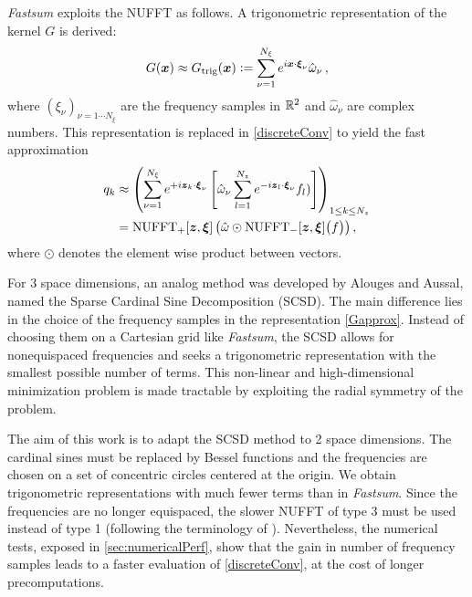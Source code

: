 \documentclass[smallextended]{svjour3}
\begin{document}
\textit{Fastsum} exploits the NUFFT as follows. A trigonometric representation of the kernel $G$ is derived:
\begin{equation}
\label{Gapprox}
G(\boldsymbol{x}) \approx G_{\text{trig}}(\boldsymbol{x}) \mathrel{\mathop:}= \sum_{\nu=1}^{N_\xi} e^{i  \boldsymbol{x}\cdot \boldsymbol{\xi}_\nu} \hat{\omega}_\nu\,,
\end{equation}
where $(\xi_\nu)_{\nu = 1 \cdots N_\xi}$ are the frequency samples in $\mathbb{R}^2$ and $\hat{\omega}_\nu$ are complex numbers. This representation is replaced in \eqref{discreteConv} to yield the fast approximation
\begin{equation}
\begin{split}	q_{k} &\approx \left(\sum_{\nu = 1}^{N_\xi} e^{+i  \boldsymbol{z}_k  \cdot\boldsymbol{\xi}_\nu } \left[\hat{\omega}_\nu \sum_{l=1}^{N_z} e^{- i \boldsymbol{z}_l \cdot \boldsymbol{\xi}_\nu} f_l) \right]\right)_{1 \leq k \leq N_z}\\
&= \operatorname{NUFFT}_+[\boldsymbol{z},\boldsymbol{\xi}]\left(\hat{\omega} \odot \operatorname{NUFFT}_-[\boldsymbol{z},\boldsymbol{\xi}]\big(f\big)\right),
\end{split}
\label{far convolution}					
\end{equation}
where $\odot$ denotes the element wise product between vectors.

For 3 space dimensions, an analog method was developed by Alouges and Aussal, named the Sparse Cardinal Sine Decomposition (SCSD). The main difference lies in the choice of the frequency samples in the representation \eqref{Gapprox}. Instead of choosing them on a Cartesian grid like \textit{Fastsum}, the SCSD allows for nonequispaced frequencies and seeks a trigonometric representation with the smallest possible number of terms. This non-linear and high-dimensional minimization problem is made tractable by exploiting the radial symmetry of the problem. 

The aim of this work is to adapt the SCSD method to 2 space dimensions. The cardinal sines must be replaced by Bessel functions and the frequencies are chosen on a set of concentric circles centered at the origin. We obtain trigonometric representations with much fewer terms than in \textit{Fastsum}. Since the frequencies are no longer equispaced, the slower NUFFT of type 3 must be used instead of type 1 (following the terminology of \cite{lee2005type}). Nevertheless, the numerical tests, exposed in \autoref{sec:numericalPerf}, show that the gain in number of frequency samples leads to a faster evaluation of \eqref{discreteConv}, at the cost of longer precomputations.
\end{document}
